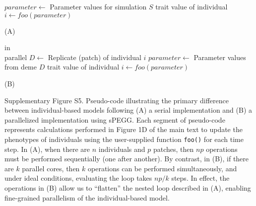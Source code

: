 \documentclass[11pt]{article}
\begin{document}
\begin{algorithmic}
\Large{}
	\State $parameter \gets $ Parameter values for 
	\State \hspace{1.75in} simulation $S$
	\State trait value of individual $i \gets foo(parameter)$
\EndFor
\EndFor
\end{algorithmic}
\begin{center}
\Large{(A)}
\end{center}

\begin{algorithmic}
\Large{}
 in\\
\hspace{1.5in} parallel
\Large{}
	\State $D \gets $ Replicate (patch) of individual $i$
	\State $parameter \gets $ Parameter values from
	\State \hspace{1.75in} deme $D$
	\State trait value of individual $i \gets foo(parameter)$
\EndFor
\end{algorithmic}
\begin{center}
\Large{(B)}\\
\end{center}

\begin{singlespace}
\noindent Supplementary Figure S5. Pseudo-code illustrating the primary difference between individual-based models following (A) a serial implementation and (B) a parallelized implementation using sPEGG. Each segment of pseudo-code represents calculations performed in Figure 1D of the main text to update the phenotypes of individuals using the user-supplied function \texttt{foo()} for each time step. In (A), when there are $n$ individuals and $p$ patches, then $np$ operations must be performed sequentially (one after another). By contrast, in (B), if there are $k$ parallel cores, then $k$ operations can be performed simultaneously, and under ideal conditions, evaluating the loop takes $np/k$ steps. In effect, the operations in (B) allow us to ``flatten'' the nested loop described in (A), enabling fine-grained parallelism of the individual-based model.
\end{singlespace}
\end{document}
